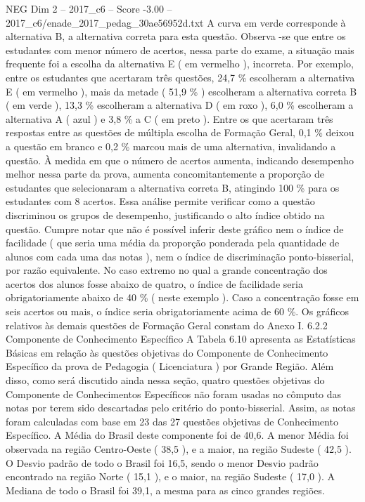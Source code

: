 \begin{textsample}{NEG Dim 2 – 2017\_c6 – Score -3.00 – 2017\_c6/enade\_2017\_pedag\_30ae56952d.txt}
A curva em verde corresponde à alternativa B, a alternativa correta para esta questão.
Observa -se que entre os estudantes com menor número de acertos, nessa parte do exame, a situação mais frequente foi a escolha da alternativa E ( em vermelho ), incorreta.
Por exemplo, entre os estudantes que acertaram três questões, 24,7 \% escolheram a alternativa E ( em vermelho ), mais da metade ( 51,9 \% ) escolheram a alternativa correta B ( em verde ), 13,3 \% escolheram a alternativa D ( em roxo ), 6,0 \% escolheram a alternativa A ( azul ) e 3,8 \% a C ( em preto ).
Entre os que acertaram três respostas entre as questões de múltipla escolha de Formação Geral, 0,1 \% deixou a questão em branco e 0,2 \% marcou mais de uma alternativa, invalidando a questão.
À medida em que o número de acertos aumenta, indicando desempenho melhor nessa parte da prova, aumenta concomitantemente a proporção de estudantes que selecionaram a alternativa correta B, atingindo 100 \% para os estudantes com 8 acertos.
Essa análise permite verificar como a questão discriminou os grupos de desempenho, justificando o alto índice obtido na questão.
Cumpre notar que não é possível inferir deste gráfico nem o índice de facilidade ( que seria uma média da proporção ponderada pela quantidade de alunos com cada uma das notas ), nem o índice de discriminação ponto-bisserial, por razão equivalente.
No caso extremo no qual a grande concentração dos acertos dos alunos fosse abaixo de quatro, o índice de facilidade seria obrigatoriamente abaixo de 40 \% ( neste exemplo ).
Caso a concentração fosse em seis acertos ou mais, o índice seria obrigatoriamente acima de 60 \%.
Os gráficos relativos às demais questões de Formação Geral constam do Anexo I. 6.2.2 Componente de Conhecimento Específico A Tabela 6.10 apresenta as Estatísticas Básicas em relação às questões objetivas do Componente de Conhecimento Específico da prova de Pedagogia ( Licenciatura ) por Grande Região.
Além disso, como será discutido ainda nessa seção, quatro questões objetivas do Componente de Conhecimentos Específicos não foram usadas no cômputo das notas por terem sido descartadas pelo critério do ponto-bisserial.
Assim, as notas foram calculadas com base em 23 das 27 questões objetivas de Conhecimento Específico.
A Média do Brasil deste componente foi de 40,6.
A menor Média foi observada na região Centro-Oeste ( 38,5 ), e a maior, na região Sudeste ( 42,5 ).
O Desvio padrão de todo o Brasil foi 16,5, sendo o menor Desvio padrão encontrado na região Norte ( 15,1 ), e o maior, na região Sudeste ( 17,0 ).
A Mediana de todo o Brasil foi 39,1, a mesma para as cinco grandes regiões.

\end{textsample}
